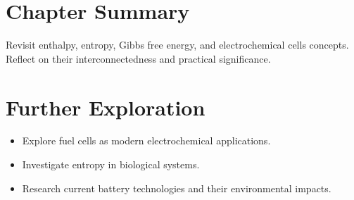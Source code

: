 \section*{Chapter Summary}

Revisit enthalpy, entropy, Gibbs free energy, and electrochemical cells concepts. Reflect on their interconnectedness and practical significance.

\FloatBarrier

\section*{Further Exploration}
\begin{itemize}
\item Explore fuel cells as modern electrochemical applications.
\item Investigate entropy in biological systems.
\item Research current battery technologies and their environmental impacts.
\end{itemize}